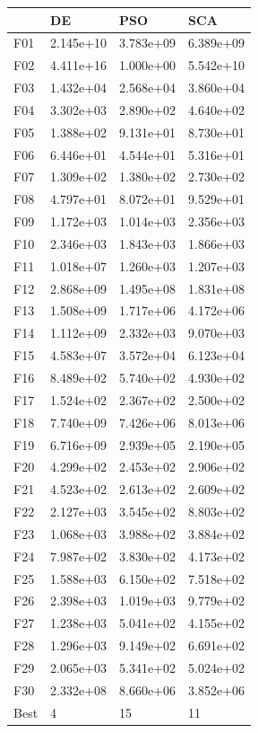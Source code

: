 \begin{tabular}{llll}
\toprule
{} &         DE &        PSO &        SCA \\
\midrule
F01  &  2.145e+10 &  3.783e+09 &  6.389e+09 \\
F02  &  4.411e+16 &  1.000e+00 &  5.542e+10 \\
F03  &  1.432e+04 &  2.568e+04 &  3.860e+04 \\
F04  &  3.302e+03 &  2.890e+02 &  4.640e+02 \\
F05  &  1.388e+02 &  9.131e+01 &  8.730e+01 \\
F06  &  6.446e+01 &  4.544e+01 &  5.316e+01 \\
F07  &  1.309e+02 &  1.380e+02 &  2.730e+02 \\
F08  &  4.797e+01 &  8.072e+01 &  9.529e+01 \\
F09  &  1.172e+03 &  1.014e+03 &  2.356e+03 \\
F10  &  2.346e+03 &  1.843e+03 &  1.866e+03 \\
F11  &  1.018e+07 &  1.260e+03 &  1.207e+03 \\
F12  &  2.868e+09 &  1.495e+08 &  1.831e+08 \\
F13  &  1.508e+09 &  1.717e+06 &  4.172e+06 \\
F14  &  1.112e+09 &  2.332e+03 &  9.070e+03 \\
F15  &  4.583e+07 &  3.572e+04 &  6.123e+04 \\
F16  &  8.489e+02 &  5.740e+02 &  4.930e+02 \\
F17  &  1.524e+02 &  2.367e+02 &  2.500e+02 \\
F18  &  7.740e+09 &  7.426e+06 &  8.013e+06 \\
F19  &  6.716e+09 &  2.939e+05 &  2.190e+05 \\
F20  &  4.299e+02 &  2.453e+02 &  2.906e+02 \\
F21  &  4.523e+02 &  2.613e+02 &  2.609e+02 \\
F22  &  2.127e+03 &  3.545e+02 &  8.803e+02 \\
F23  &  1.068e+03 &  3.988e+02 &  3.884e+02 \\
F24  &  7.987e+02 &  3.830e+02 &  4.173e+02 \\
F25  &  1.588e+03 &  6.150e+02 &  7.518e+02 \\
F26  &  2.398e+03 &  1.019e+03 &  9.779e+02 \\
F27  &  1.238e+03 &  5.041e+02 &  4.155e+02 \\
F28  &  1.296e+03 &  9.149e+02 &  6.691e+02 \\
F29  &  2.065e+03 &  5.341e+02 &  5.024e+02 \\
F30  &  2.332e+08 &  8.660e+06 &  3.852e+06 \\
Best &          4 &         15 &         11 \\
\bottomrule
\end{tabular}
